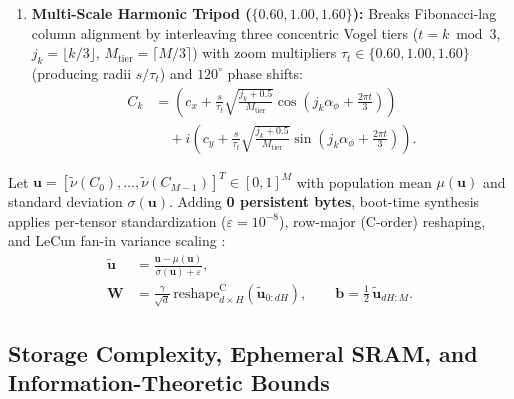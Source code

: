 \begin{enumerate}
\begin{align}
        &\quad + i\left(c_y + s\sqrt{\frac{k+0.5}{M}}\sin(k\alpha_\phi)\right).
    \end{align}
    By Hurwitz's theorem \cite{hurwitz1891ueber}, $\phi$ is worst-approximable by rationals, preventing low-period angular clustering of consecutive indices $k, k+1$ (though parastichy alignment persists at Fibonacci column lags $F_m \in \{8,13,21,34,\dots\}$).
    \item \textbf{Multi-Scale Harmonic Tripod ($\{0.60, 1.00, 1.60\}$):} Breaks Fibonacci-lag column alignment by interleaving three concentric Vogel tiers ($t = k\bmod 3$, $j_k = \lfloor k/3\rfloor$, $M_{\mathrm{tier}} = \lceil M/3\rceil$) with zoom multipliers $\tau_t \in \{0.60, 1.00, 1.60\}$ (producing radii $s/\tau_t$) and $120^\circ$ phase shifts:
    \begin{align}
    \label{eq:tripod}
    C_k &= \left(c_x + \frac{s}{\tau_t}\sqrt{\frac{j_k+0.5}{M_{\mathrm{tier}}}}\cos\!\left(j_k\alpha_\phi + \frac{2\pi t}{3}\right)\right) \nonumber\\
        &\quad + i\left(c_y + \frac{s}{\tau_t}\sqrt{\frac{j_k+0.5}{M_{\mathrm{tier}}}}\sin\!\left(j_k\alpha_\phi + \frac{2\pi t}{3}\right)\right).
    \end{align}
\end{enumerate}

Let $\mathbf{u} = [\tilde{\nu}(C_0),\dots,\tilde{\nu}(C_{M-1})]^T \in [0,1]^M$ with population mean $\mu(\mathbf{u})$ and standard deviation $\sigma(\mathbf{u})$. Adding \textbf{0 persistent bytes}, boot-time synthesis applies per-tensor standardization ($\varepsilon = 10^{-8}$), row-major (C-order) reshaping, and LeCun fan-in variance scaling \cite{lecun1998efficient}:
\begin{align}
\label{eq:lecun}
\tilde{\mathbf{u}} &= \frac{\mathbf{u} - \mu(\mathbf{u})}{\sigma(\mathbf{u}) + \varepsilon}, \\
\mathbf{W} &= \frac{\gamma}{\sqrt{d}}\,\mathrm{reshape}_{d\times H}^{\mathrm{C}}(\tilde{\mathbf{u}}_{0:dH}), \qquad
\mathbf{b} = \frac{1}{2}\,\tilde{\mathbf{u}}_{dH:M}. \nonumber
\end{align}

\subsection{Storage Complexity, Ephemeral SRAM, and Information-Theoretic Bounds}
\label{sec:theory}

